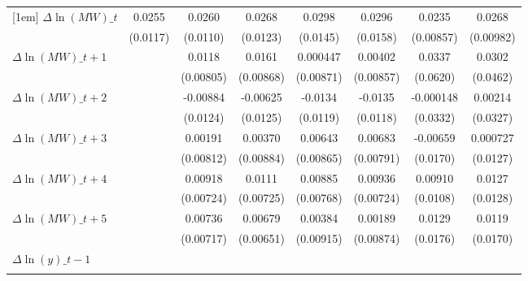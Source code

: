 {\begin{tabular}{l*{7}{c}}
[1em]
$\Delta \ln(MW)\_{t}$&   0.0255\sym{**} &   0.0260\sym{**} &   0.0268\sym{**} &   0.0298\sym{**} &   0.0296\sym{*}  &   0.0235\sym{***}&   0.0268\sym{***}\\
          & (0.0117)         & (0.0110)         & (0.0123)         & (0.0145)         & (0.0158)         &(0.00857)         &(0.00982)         \\
[1em]
$\Delta \ln(MW)\_{t+1}$&                  &   0.0118         &   0.0161\sym{*}  & 0.000447         &  0.00402         &   0.0337         &   0.0302         \\
          &                  &(0.00805)         &(0.00868)         &(0.00871)         &(0.00857)         & (0.0620)         & (0.0462)         \\
[1em]
$\Delta \ln(MW)\_{t+2}$&                  & -0.00884         & -0.00625         &  -0.0134         &  -0.0135         &-0.000148         &  0.00214         \\
          &                  & (0.0124)         & (0.0125)         & (0.0119)         & (0.0118)         & (0.0332)         & (0.0327)         \\
[1em]
$\Delta \ln(MW)\_{t+3}$&                  &  0.00191         &  0.00370         &  0.00643         &  0.00683         & -0.00659         & 0.000727         \\
          &                  &(0.00812)         &(0.00884)         &(0.00865)         &(0.00791)         & (0.0170)         & (0.0127)         \\
[1em]
$\Delta \ln(MW)\_{t+4}$&                  &  0.00918         &   0.0111         &  0.00885         &  0.00936         &  0.00910         &   0.0127         \\
          &                  &(0.00724)         &(0.00725)         &(0.00768)         &(0.00724)         & (0.0108)         & (0.0128)         \\
[1em]
$\Delta \ln(MW)\_{t+5}$&                  &  0.00736         &  0.00679         &  0.00384         &  0.00189         &   0.0129         &   0.0119         \\
          &                  &(0.00717)         &(0.00651)         &(0.00915)         &(0.00874)         & (0.0176)         & (0.0170)         \\
[1em]
$\Delta \ln(y)\_{t-1}$&                  &                  &                  &                  &                  &                  &                  \\
          &                  &                  &                  &                  &                  &                  &                  \\

\end{tabular}}
